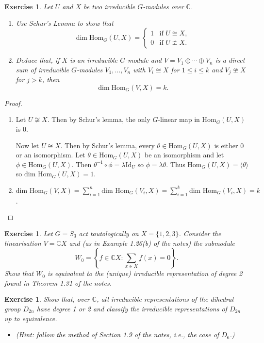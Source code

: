 \documentclass{article}
\newtheorem{exercise}[theorem]{Exercise}
\begin{document}
\begin{exercise}
     Let \( U \) and \( X \) be two irreducible \( G \)-modules over \( \mathbb{C} \).
    \begin{enumerate}
        \item[(a)] Use Schur's Lemma to show that
        \[
        \dim \mathrm{Hom}_G(U, X) =
        \begin{cases}
        1 & \text{if } U \cong X, \\
        0 & \text{if } U \ncong X.
        \end{cases}
        \]
        \item[(b)] Deduce that, if \( X \) is an irreducible \( G \)-module and \( V = V_1 \oplus \cdots \oplus V_n \) is a direct sum of irreducible \( G \)-modules \( V_1, \dots, V_n \) with \( V_i \cong X \) for \( 1 \leq i \leq k \) and \( V_j \ncong X \) for \( j > k \), then
        \[
        \dim \mathrm{Hom}_G(V, X) = k.
        \]
    \end{enumerate}
\end{exercise}

\begin{proof}
\begin{enumerate}
    \item[(a)] Let $U\not\cong X$. Then by Schur's lemma, the only $G$-linear map in $\text{Hom}_G(U,X)$ is $0$.

    Now let $U\cong X$. Then by Schur's lemma, every $\theta\in \text{Hom}_G(U,X)$ is either $0$ or an isomorphism. Let $\theta\in \text{Hom}_G(U,X)$ be an isomorphism and let $\phi\in \text{Hom}_G(U,X)$. Then $\theta^{-1}\circ\phi=\lambda\text{Id}_U$ so $\phi=\lambda\theta$. Thus $\text{Hom}_G(U,X)=\langle\theta\rangle$ so $\text{dim Hom}_G(U,X)=1$.
    \item[(b)]  $\text{dim Hom}_G(V,X)=\sum_{i=1}^n\text{dim Hom}_G(V_i,X)=\sum_{i=1}^k\text{dim Hom}_G(V_i,X)=k$.
\end{enumerate}
\end{proof}

\begin{exercise}
     Let \( G = S_3 \) act tautologically on \( X = \{1, 2, 3\} \). Consider the linearisation \( V = \mathbb{C}X \) and (as in Example 1.26(b) of the notes) the submodule
    \[
    W_0 = \left\{ f \in \mathbb{C}X : \sum_{x \in X} f(x) = 0 \right\}.
    \]
    Show that \( W_0 \) is equivalent to the (unique) irreducible representation of degree 2 found in Theorem 1.31 of the notes.
\end{exercise}
\begin{exercise}
     Show that, over \( \mathbb{C} \), all irreducible representations of the dihedral group \( D_{2n} \) have degree 1 or 2 and classify the irreducible representations of \( D_{2n} \) up to equivalence.
    \begin{itemize}
        \item (Hint: follow the method of Section 1.9 of the notes, i.e., the case of \( D_6 \).)
    \end{itemize}
\end{exercise}
\end{document}

